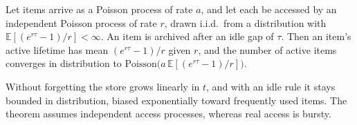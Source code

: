 \begin{theorem}\label{thm:store}
Let items arrive as a Poisson process of rate $a$, and let each be accessed by an independent Poisson process of rate $r$, drawn i.i.d.\ from a distribution with $\mathbb{E}[(e^{r\tau}-1)/r]<\infty$. An item is archived after an idle gap of $\tau$. Then an item's active lifetime has mean $(e^{r\tau}-1)/r$ given $r$, and the number of active items converges in distribution to $\mathrm{Poisson}\big(a\,\mathbb{E}[(e^{r\tau}-1)/r]\big)$.
\end{theorem}

Without forgetting the store grows linearly in $t$, and with an idle rule it stays bounded in distribution, biased exponentially toward frequently used items. The theorem assumes independent access processes, whereas real access is bursty.
